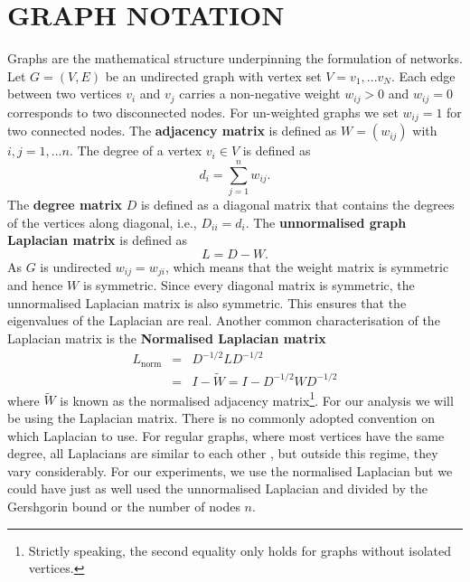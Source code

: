 \documentclass{article}
\begin{document}
\section{GRAPH NOTATION }
Graphs are the mathematical structure underpinning the formulation of networks. Let $G = (V,E)$ be an undirected graph with vertex set $V = {v_{1},...v_{N}}$. Each edge between two vertices $v_{i}$ and $v_{j}$ carries a non-negative weight $w_{ij}>0$ and $w_{ij}=0$ corresponds to two disconnected nodes. For un-weighted graphs we set $w_{ij}=1$ for two connected nodes. The \textbf{adjacency matrix} is defined as $W = (w_{ij})$ with $i,j=1,...n$. The degree of a vertex $v_{i} \in V$ is defined as 
\begin{equation}
d_{i} = \sum_{j=1}^{n}w_{ij}.
\end{equation}
The \textbf{degree matrix} $D$ is defined as a diagonal matrix that contains the degrees of the vertices along diagonal, i.e., $D_{ii} = d_{i}$. The \textbf{unnormalised graph Laplacian matrix} is defined as
\begin{equation}
L = D - W.
\end{equation}
As $G$ is undirected $w_{ij}=w_{ji}$, which means that the weight matrix is symmetric and hence $W$ is symmetric. Since every diagonal matrix is symmetric, the unnormalised Laplacian matrix is also symmetric. This ensures that the eigenvalues of the Laplacian are real. Another common characterisation of the Laplacian matrix is the \textbf{Normalised Laplacian matrix} \citep{chung1997spectral}
\begin{eqnarray}
L_{\mathrm{norm}} &=& D^{-1/2}LD^{-1/2}  \nonumber\\
 &=& I - \tilde{W} = I - D^{-1/2}WD^{-1/2}\label{lnorm}
\end{eqnarray}
where $\tilde{W}$ is known as the normalised adjacency matrix\footnote{Strictly speaking, the second equality only holds for graphs without isolated vertices.}. For our analysis we will be using the Laplacian matrix. 
There is no commonly adopted convention on which Laplacian to use. For regular graphs, where most vertices have the same degree, all Laplacians are similar to each other \citep{von2007tutorial}, but outside this regime, they vary considerably. For our experiments, we use the normalised Laplacian but we could have just as well used the unnormalised Laplacian and divided by the Gershgorin bound \citep{gershgorin1931uber} or the number of nodes $n$.

\end{document}
